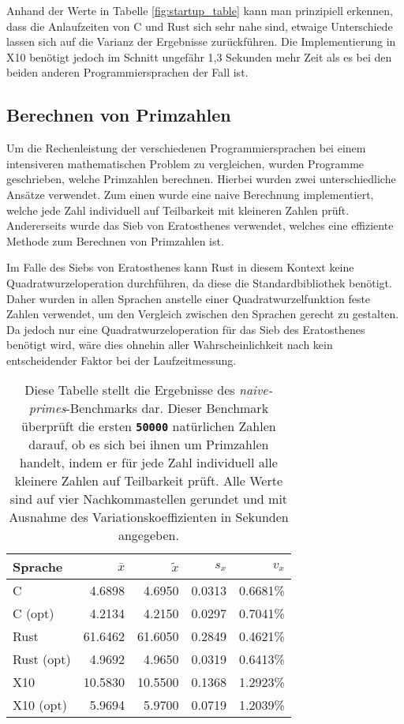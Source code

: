 Anhand der Werte in Tabelle \ref{fig:startup_table} kann man prinzipiell erkennen,
dass die Anlaufzeiten von C und Rust sich sehr nahe sind, etwaige Unterschiede lassen sich auf die Varianz der
Ergebnisse zurückführen. Die Implementierung in X10 benötigt jedoch im Schnitt ungefähr 1,3 Sekunden mehr Zeit
als es bei den beiden anderen Programmiersprachen der Fall ist.


\subsection{Berechnen von Primzahlen}\label{sec:primes_calc}

Um die Rechenleistung der verschiedenen Programmiersprachen bei einem intensiveren mathematischen Problem zu 
vergleichen, wurden Programme geschrieben, welche Primzahlen berechnen.
Hierbei wurden zwei unterschiedliche Ansätze verwendet. Zum einen wurde
eine naive Berechnung implementiert, welche jede Zahl individuell auf Teilbarkeit mit kleineren Zahlen prüft. 
Andererseits wurde das Sieb von Eratosthenes verwendet, welches eine effiziente Methode zum Berechnen von Primzahlen
ist.

Im Falle des Siebs von Eratosthenes kann Rust in diesem Kontext keine Quadratwurzeloperation durchführen,
da diese die Standardbibliothek benötigt. Daher wurden in allen Sprachen anstelle einer Quadratwurzelfunktion
feste Zahlen verwendet, um den Vergleich zwischen den Sprachen gerecht zu gestalten.
Da jedoch nur eine Quadratwurzeloperation für das Sieb des Eratosthenes
benötigt wird, wäre dies ohnehin aller Wahrscheinlichkeit nach kein entscheidender Faktor bei der Laufzeitmessung.

\begin{table}[hb]
	\begin{center}
		\begin{tabular}{lrrrr}
			\toprule
			Sprache    & $\bar{x}$ & $\tilde{x}$ & $s_x$ & $v_x$   \\
			\midrule
			C          &  4.6898  & 4.6950  & 0.0313 & 0.6681\% \\
			C (opt)    &  4.2134  & 4.2150  & 0.0297 & 0.7041\% \\
			Rust       & 61.6462  & 61.6050 & 0.2849 & 0.4621\% \\
			Rust (opt) &  4.9692  &  4.9650 & 0.0319 & 0.6413\% \\
			X10        & 10.5830  & 10.5500 & 0.1368 & 1.2923\% \\
			X10 (opt)  &  5.9694  &  5.9700 & 0.0719 & 1.2039\% \\
			\bottomrule
		\end{tabular}
	\end{center}
	\caption{
		Diese Tabelle stellt die Ergebnisse des \textit{naive-primes}-Benchmarks dar.
		Dieser Benchmark überprüft die ersten \texttt{\textsc{\textbf{50000}}} natürlichen Zahlen darauf,
		ob es sich bei ihnen um Primzahlen handelt,
		indem er für jede Zahl individuell alle kleinere Zahlen auf Teilbarkeit prüft.
		Alle Werte sind auf vier Nachkommastellen gerundet und mit Ausnahme des Variationskoeffizienten
		in Sekunden angegeben.
	}
	\label{fig:primes_naive_table}
\end{table}

